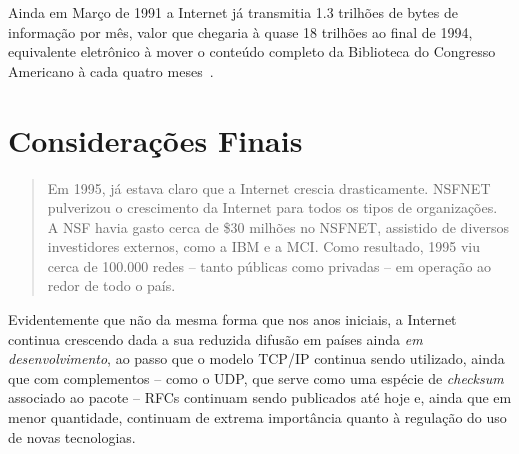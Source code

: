 \documentclass[conference]{IEEEtran}
\begin{document}
  Ainda em Março de 1991 a Internet já transmitia 1.3 trilhões de bytes de
  informação por mês, valor que chegaria à quase 18 trilhões ao final de 1994,
  equivalente eletrônico à mover o conteúdo completo da Biblioteca do Congresso
  Americano à cada quatro meses~\cite{nsfnet}.

\section{Considerações Finais}

  \begin{quote}

    Em 1995, já estava claro que a Internet crescia drasticamente.
    NSFNET pulverizou o crescimento da Internet para todos os tipos de
    organizações. A NSF havia gasto cerca de \$30 milhões no NSFNET, assistido
    de diversos investidores externos, como a IBM e a MCI. Como resultado, 1995
    viu cerca de 100.000 redes -- tanto públicas como privadas -- em operação ao
    redor de todo o país.~\cite{nsfnet}
    
  \end{quote}

  Evidentemente que não da mesma forma que nos anos iniciais, a Internet
  continua crescendo dada a sua reduzida difusão em países ainda \emph{em
    desenvolvimento}, ao passo que o modelo TCP/IP continua sendo utilizado,
  ainda que com complementos -- como o UDP, que serve como uma espécie de
  \emph{checksum} associado ao pacote -- RFCs continuam sendo publicados até
  hoje e, ainda que em menor quantidade, continuam de extrema importância quanto
  à regulação do uso de novas tecnologias.
  









\end{document}
